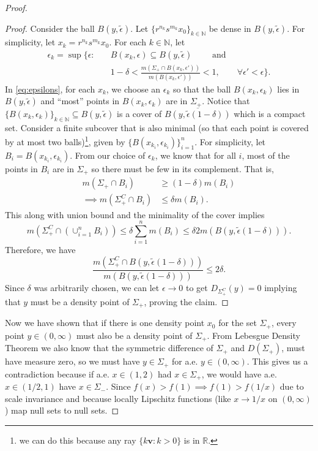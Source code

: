 \documentclass{article}
\newcommand{\te}{\tilde\epsilon}
\newcommand{\e}{\epsilon}
\newcommand{\R}{\mathbb{R}}
\newcommand{\N}{\mathbb{N}}
\begin{document}
\begin{proof}[Proof]
\begin{leftbar}
\begin{proof}
    Consider the ball $B(y,\tilde\epsilon)$. Let
    $\{ r^{n_k}s^{m_k}x_0\}_{k\in\N} $ be dense in $B(y,\te)$. For
    simplicity, let $x_k = r^{n_k} s^{m_k}x_0$.    For each $k\in\N$, let
    \begin{align}
      \label{eq:epsilons}
      \e_k = \sup\{\e: & \quad B(x_k,\e)\subseteq B(y,\te) \qquad \mbox{ and
      }\nonumber \\
     & \quad 1-\delta < \frac{m(\Sigma_+\cap
      B(x_k,\e'))}{m(B(x_k,\e'))} <1,  \qquad   \forall \e'<\e \}.
    \end{align}
In \eqref{eq:epsilons}, for each $x_k$, we choose an $\e_k$ so that the ball
    $B(x_k,\e_k)$ lies in $B(y,\tilde \e)$ and ``most'' points in
    $B(x_k,\e_k)$ are in $\Sigma_+$.
    Notice that $\{ B(x_k,\e_k)\}_{k\in\N} \subseteq B(y,\te)$ is a cover of
    $\overline{B(y,\te (1-\delta))}$ which is a compact set. Consider
    a finite subcover that is also minimal (so that each point is
    covered by at most two balls)\footnote{ we can do this because any ray $\{k
    \mathbf{v}:k>0\}$ is in $\R$.}, given by
    $\{B(x_{k_i},\epsilon_{k_i})\}_{i=1}^n$. For simplicity, let $B_i
    = B(x_{k_i},\epsilon_{k_i}) .$
    From our choice of $\e_k$, we know that for all $i$, most of the
    points in $B_i$ are in $\Sigma_+$ so there must be few in its
    complement. That is,
    \begin{align*}
      m(\Sigma_+\cap B_i)&\geq (1-\delta) m(B_i)\\
    \implies  m(\Sigma_+^C\cap B_i)&\leq \delta m(B_i).
    \end{align*}
This along with union bound and the minimality of the cover implies
     $$ m(\Sigma_+^C \cap (\cup_{i=1}^n B_i))\leq
    \delta\sum_{i=1}^n m(B_i)\leq \delta 2 m(B(y,\te (1-\delta))).$$
Therefore, we have \[\frac{m(\Sigma_+^C \cap B(y,\te
        (1-\delta)))}{m(B(y,\te (1-\delta)))} \leq 2\delta.\]    Since $\delta$ was arbitrarily chosen, we can let $\e \rightarrow
        0$ to get $D_{\Sigma_+^C}(y) =0$ implying
    that $y$ must be a density point of $\Sigma_+$, proving the claim.\end{proof}

\end{leftbar}



Now we have shown that if there is one density point $x_0$ for the set
    $\Sigma_+$,  every point  $y\in(0,\infty)$ must also be a density point of
    $\Sigma_+$. %
    From Lebesgue Density Theorem we also know that the
    symmetric difference of $\Sigma_+$ and
    $D(\Sigma_+)$, must have measure zero, so we must have
    $y\in\Sigma_+$ for a.e. $y\in(0,\infty)$.
    This gives us a contradiction because if a.e. $x\in(1,2)$ had
    $x\in\Sigma_+$, we would have a.e. $x\in(1/2,1)$ have
    $x\in\Sigma_-$. Since $f(x)>f(1)\implies f(1)>f(1/x)$ due to
    scale invariance and because locally Lipschitz functions (like
    $x\rightarrow 1/x$ on $(0,\infty)$) map null sets to null sets. %


\end{proof}
\end{document}
